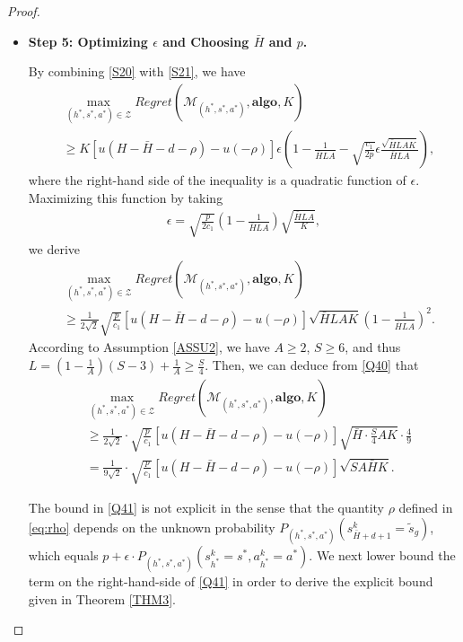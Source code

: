 \documentclass[11pt]{article}
\newcommand{\1}{\mathbbm{1}}
\begin{document}
\begin{proof}
\begin{itemize}
\item \textbf{Step 5: Optimizing $\epsilon$ and Choosing $\bar{H}$ and $p$.}

By combining \eqref{S20} with \eqref{S21}, we have 
\begin{align}
&\mathop{\max}_{(h^*,s^*,a^*) \in \mathcal{Z} } Regret(\mathcal{M}_{(h^*,s^*,a^*)},\textbf{algo},K)\nonumber\\
&\geq K[u(H-\bar{H}-d-\rho)-u(-\rho)]\epsilon \left (1-\frac{1}{\bar{H}LA}-\sqrt{\frac{c_1}{2p}}\epsilon\frac{\sqrt{\bar{H}LAK}}{\bar{H}LA}\right ),\label{Q39}
\end{align}
where the right-hand side of the inequality is a quadratic function of $\epsilon$. Maximizing this function by taking 
\begin{align}\label{eq:eps-choice}
\epsilon=\sqrt{\frac{p}{2c_1}}\left(1-\frac{1}{\bar{H}LA}\right)\sqrt{\frac{\bar{H}LA}{K}},
\end{align}
we derive
\begin{align}
&\mathop{\max}_{(h^*,s^*,a^*) \in \mathcal{Z}} Regret(\mathcal{M}_{(h^*,s^*,a^*)},\textbf{algo},K)\nonumber\\
&\geq \frac{1}{2\sqrt{2}}\sqrt{\frac{p}{c_1}}[u(H-\bar{H}-d-\rho)-u(-\rho)]\sqrt{\bar{H}LAK}(1-\frac{1}{\bar{H}LA})^2.\label{Q40}
\end{align}
According to Assumption \ref{ASSU2}, we have $A\geq 2$, $S\geq 6$, and thus $L=(1-\frac{1}{A})(S-3)+\frac{1}{A}\geq \frac{S}{4}$. Then, we can deduce from \eqref{Q40} that
\begin{align}
&\mathop{\max}_{(h^*,s^*,a^*) \in \mathcal{Z} } Regret(\mathcal{M}_{(h^*,s^*,a^*)},\textbf{algo},K)\nonumber\\
&\geq \frac{1}{2\sqrt{2}}\cdot \sqrt{\frac{p}{c_1}}[u(H-\bar{H}-d-\rho)-u(-\rho)]\sqrt{\bar{H}\cdot\frac{S}{4}AK}\cdot \frac{4}{9}\nonumber\\
&= \frac{1}{9\sqrt{2}}\cdot \sqrt{\frac{p}{c_1}}[u(H-\bar{H}-d-\rho)-u(-\rho)]\sqrt{SA\bar{H}K}.\label{Q41}
\end{align}

The bound in \eqref{Q41} is not explicit in the sense that the quantity $\rho$ defined in \eqref{eq:rho} depends on the unknown probability $P_{(h^*,s^*,a^*)}(s^k_{\bar{H}+d+1}=\tilde{s}_g)$, which equals $p+\epsilon \cdot P_{(h^*,s^*,a^*)}(s_{h^*}^k=s^*,a_{h^*}^k=a^*)$. We next lower bound the term on the right-hand-side of \eqref{Q41} in order to derive the explicit bound given in Theorem \ref{THM3}. 


\end{itemize}
\end{proof}
\end{document}
